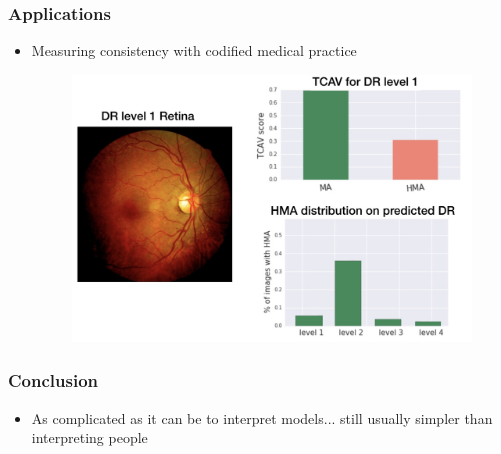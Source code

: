 \documentclass[10pt,mathserif]{beamer}
\begin{document}
\begin{frame}
  \frametitle{Applications}
  \begin{itemize}
  \item Measuring consistency with codified medical practice
    \begin{figure}[ht]
      \centering
      \includegraphics[width=0.7\paperwidth]{figure/cav_app1}
    \end{figure}
  \end{itemize}  
\end{frame}

\begin{frame}
  \frametitle{Conclusion}
\begin{itemize}
\item As complicated as it can be to interpret models... still usually simpler
  than interpreting people
\end{itemize}
\end{frame}
\end{document}
